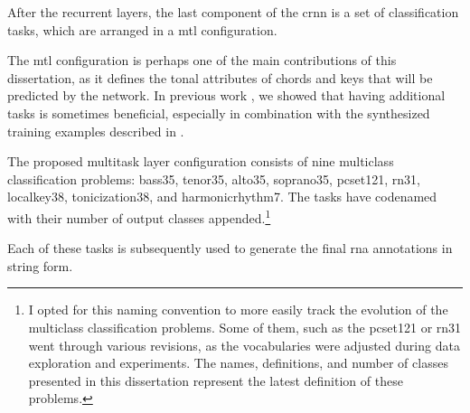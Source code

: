 
After the recurrent layers, the last component of the
\gls{crnn} is a set of classification tasks, which are
arranged in a \gls{mtl} configuration. 

The \gls{mtl} configuration is perhaps one of the main
contributions of this dissertation, as it defines the tonal
attributes of chords and keys that will be predicted by the
network. In previous work
\parencite{napoleslopez2021augmentednet}, we showed that
having additional tasks is sometimes beneficial, especially
in combination with the synthesized training examples
described in .

The proposed multitask layer configuration consists of nine
multiclass classification problems: \gls{bass35},
\gls{tenor35}, \gls{alto35}, \gls{soprano35},
\gls{pcset121}, \gls{rn31}, \gls{localkey38},
\gls{tonicization38}, and \gls{harmonicrhythm7}. The tasks
have codenamed with their number of output classes
appended.\footnote{I opted for this naming convention to
more easily track the evolution of the multiclass
classification problems. Some of them, such as the
\gls{pcset121} or \gls{rn31} went through various revisions,
as the vocabularies were adjusted during data exploration
and experiments. The names, definitions, and number of
classes presented in this dissertation represent the latest
definition of these problems.}

Each of these tasks is subsequently used to generate the
final \gls{rna} annotations in string form.
